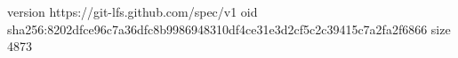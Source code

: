 version https://git-lfs.github.com/spec/v1
oid sha256:8202dfce96c7a36dfc8b9986948310df4ce31e3d2cf5c2c39415c7a2fa2f6866
size 4873
